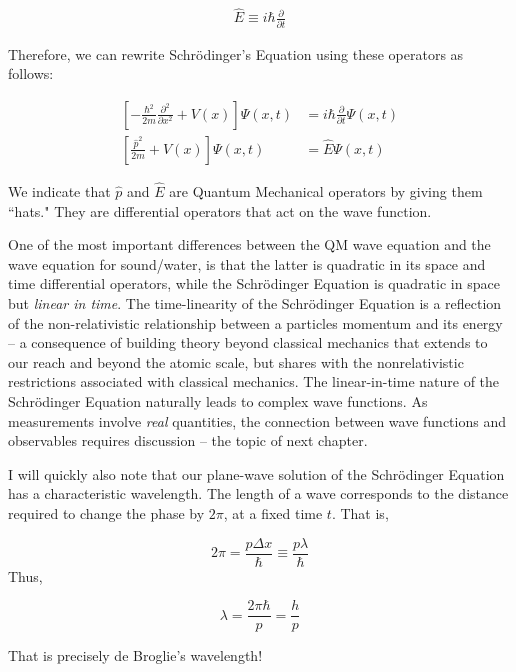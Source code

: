 \begin{align}
  \hat{E} \equiv i\hbar \frac{\partial }{\partial t} 
\end{align} \vspace{3px}

Therefore, we can rewrite Schr\"odinger's Equation using these operators as
follows: 

\begin{align*}
  \left[ -\frac{\hbar^2}{2m} \frac{\partial^2 }{\partial x^2} +V(x)\right]
  \Psi(x, t) &= i\hbar \frac{\partial }{\partial t} \Psi(x, t) \\ 
  \left[ \frac{\hat{p}^2}{2m} +V(x)\right] \Psi(x, t) &= \hat{E}\Psi(x, t)
\end{align*}

We indicate that $\hat{p}$ and $\hat{E}$ are Quantum Mechanical operators by
giving them ``hats." They are differential operators that act on the wave
function. 

One of the most important differences between the QM wave equation and the wave
equation for sound/water, is that the latter is quadratic in its space and time
differential operators, while the Schr\"odinger Equation is quadratic in space
but \textit{linear in time}. The time-linearity of the Schr\"odinger Equation
is a reflection of the non-relativistic relationship between a particles
momentum and its energy -- a consequence of building theory beyond classical
mechanics that extends to our reach and beyond the atomic scale, but shares
with the nonrelativistic restrictions associated with classical mechanics. The
linear-in-time nature of the Schr\"odinger Equation naturally leads to complex
wave functions. As measurements involve \textit{real} quantities, the
connection between wave functions and observables requires discussion -- the
topic of next chapter. 

I will quickly also note that our plane-wave solution of the Schr\"odinger
Equation has a characteristic wavelength. The length of a wave corresponds to
the distance required to change the phase by $2\pi$, at a fixed time $t$. That
is, 

\[
2\pi = \frac{p\Delta x}{\hbar} \equiv \frac{p\lambda}{\hbar} 
\] \vspace{3px}
Thus, 

\[
\lambda = \frac{2\pi\hbar}{p} = \frac{h}{p}
\] \vspace{3px}

That is precisely de Broglie's wavelength! 

\onecolumn

